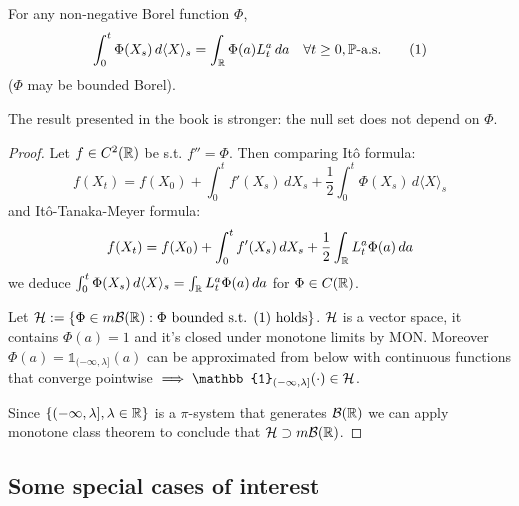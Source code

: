 \begin{corollary}
    For any non-negative Borel function $\Phi$,
    \begin{equation}
        \int_0^t \Phi(X_s) \, d\langle X \rangle_s = \int_{\mathbb R} \Phi(a) L_t^a \, da \quad \forall t \geq 0, \mathbb P\text{-a.s.} \tag{1}
    \end{equation}
    ($\Phi$ may be bounded Borel).
    \begin{remark}
        The result presented in the book is stronger: the null set does not depend on $\Phi$.
    \end{remark}
\end{corollary}

\begin{proof}
    Let $f \in C^2(\mathbb R)$ be s.t. $f'' = \Phi$. Then comparing Itô formula:
    \[ f(X_t) = f(X_0) + \int_0^t f'(X_s) \, dX_s + \frac{1}{2} \int_0^t \Phi(X_s) \, d\langle X \rangle_s \]
    and Itô-Tanaka-Meyer formula:
    \[ f(X_t) = f(X_0) + \int_0^t f'(X_s) \, dX_s + \frac{1}{2} \int_{\mathbb R} L_t^a \Phi(a) \, da \]
    we deduce $\int_0^t \Phi(X_s) \, d\langle X \rangle_s = \int_{\mathbb R} L_t^a \Phi(a) \, da$ for $\Phi \in C(\mathbb R)$.
    
    Let $\mathcal{H} := \{ \Phi \in m\mathcal{B}(\mathbb R) : \Phi \text{ bounded s.t. (1) holds} \}$.
    $\mathcal{H}$ is a vector space, it contains $\Phi(a) = 1$ and it's closed under monotone limits by MON. Moreover $\Phi(a) = \mathbb{1}_{(-\infty, \lambda]}(a)$ can be approximated from below with continuous functions that converge pointwise $\implies \mathbb{1}_{(-\infty, \lambda]}(\cdot) \in \mc{H}$.
    
    Since $\{ (-\infty, \lambda], \lambda \in \mathbb R \}$ is a $\pi$-system that generates $\mathcal{B}(\mathbb R)$ we can apply monotone class theorem to conclude that $\mathcal{H} \supset m\mathcal{B}(\mathbb R)$.
\end{proof}

\subsection{Some special cases of interest}

